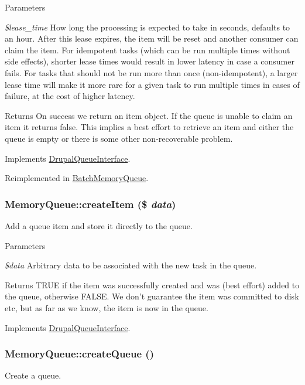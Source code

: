 \begin{DoxyParams}{Parameters}
\item[{\em \$lease\_\-time}]How long the processing is expected to take in seconds, defaults to an hour. After this lease expires, the item will be reset and another consumer can claim the item. For idempotent tasks (which can be run multiple times without side effects), shorter lease times would result in lower latency in case a consumer fails. For tasks that should not be run more than once (non-\/idempotent), a larger lease time will make it more rare for a given task to run multiple times in cases of failure, at the cost of higher latency. \end{DoxyParams}
\begin{DoxyReturn}{Returns}
On success we return an item object. If the queue is unable to claim an item it returns false. This implies a best effort to retrieve an item and either the queue is empty or there is some other non-\/recoverable problem. 
\end{DoxyReturn}


Implements \hyperlink{interfaceDrupalQueueInterface_a2f0f2ccc1f4d55c0890897ea85e75954}{DrupalQueueInterface}.

Reimplemented in \hyperlink{classBatchMemoryQueue_aca687797fff1fee4a86293e8c32190ad}{BatchMemoryQueue}.\hypertarget{classMemoryQueue_a5d8fe8085407a1a77c505ba8532b9c50}{
\subsubsection[{createItem}]{\setlength{\rightskip}{0pt plus 5cm}MemoryQueue::createItem (\$ {\em data})}}
\label{classMemoryQueue_a5d8fe8085407a1a77c505ba8532b9c50}
Add a queue item and store it directly to the queue.


\begin{DoxyParams}{Parameters}
\item[{\em \$data}]Arbitrary data to be associated with the new task in the queue. \end{DoxyParams}
\begin{DoxyReturn}{Returns}
TRUE if the item was successfully created and was (best effort) added to the queue, otherwise FALSE. We don't guarantee the item was committed to disk etc, but as far as we know, the item is now in the queue. 
\end{DoxyReturn}


Implements \hyperlink{interfaceDrupalQueueInterface_a1bdef6341808aaf8b3de821b7b71f137}{DrupalQueueInterface}.\hypertarget{classMemoryQueue_a94e1da7e8b4cccb445acb8500e0b39a5}{
\subsubsection[{createQueue}]{\setlength{\rightskip}{0pt plus 5cm}MemoryQueue::createQueue ()}}
\label{classMemoryQueue_a94e1da7e8b4cccb445acb8500e0b39a5}
Create a queue.

